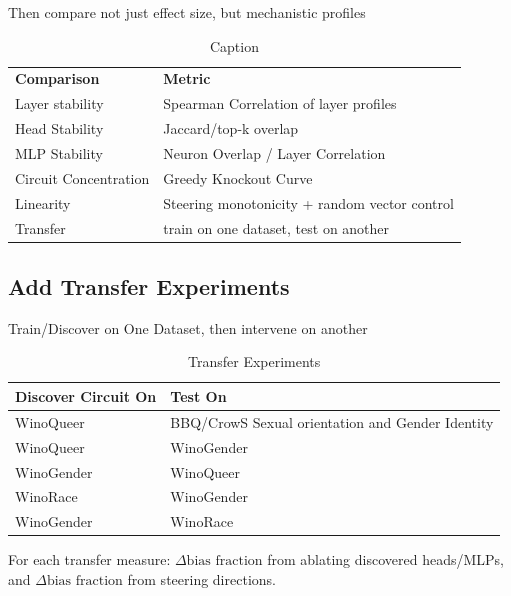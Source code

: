 Then compare not just effect size, but mechanistic profiles
\begin{table}[]
    \centering
    \begin{tabular}{l|l}
    \toprule
       \textbf{Comparison}  & \textbf{Metric}  \\
        Layer stability &  Spearman Correlation of layer profiles \\
        Head Stability  & Jaccard/top-k overlap \\
        MLP Stability & Neuron Overlap / Layer Correlation \\
        Circuit Concentration & Greedy Knockout Curve \\
        Linearity & Steering monotonicity + random vector control \\
        Transfer & train on one dataset, test on another \\
    \bottomrule
    \end{tabular}
    \caption{Caption}
    \label{tab:placeholder}
\end{table}

\subsection{Add Transfer Experiments}
Train/Discover on One Dataset, then intervene on another 
\begin{table}[]
    \centering
    \begin{tabular}{l | l}
    \toprule
        \textbf{Discover Circuit On} & \textbf{Test On}  \\
        \midrule
        WinoQueer & BBQ/CrowS Sexual orientation and Gender Identity \\
        WinoQueer & WinoGender \\
        WinoGender & WinoQueer \\
        WinoRace & WinoGender \\
        WinoGender & WinoRace
    \end{tabular}
    \caption{Transfer Experiments}
    \label{tab:placeholder}
\end{table}
For each transfer measure: $\Delta\text{bias fraction}$ from ablating discovered heads/MLPs, and $\Delta\text{bias fraction}$ from steering directions.